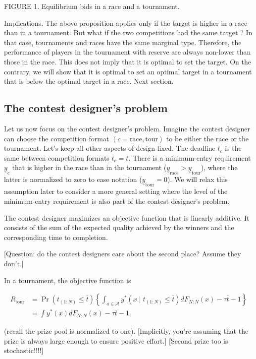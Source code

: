\documentclass[12pt,]{article}
\theoremstyle{plain} %
\newcommand\deadline{\bar{t}}
\newcommand\target{\underline{y}}
\newcommand\race{\text{race}}
\newcommand\tournament{\text{tour}}
\begin{document}
FIGURE 1. Equilibrium bids in a race and a tournament.

Implications. The above proposition applies only if the target is higher
in a race than in a tournament. But what if the two competitions had the
same target ? In that case, tournaments and races have the same marginal
type. Therefore, the performance of players in the tournament with
reserve are always non-lower than those in the race. This does not imply
that it is optimal to set the target. On the contrary, we will show that
it is optimal to set an optimal target in a tournament that is below the
optimal target in a race. Next section.

\subsection{The contest designer's
problem}\label{the-contest-designers-problem}

Let us now focus on the contest designer's problem. Imagine the contest
designer can choose the competition format \((c=\race, \tournament)\) to
be either the race or the tournament. Let's keep all other aspects of
design fixed. The deadline \(\deadline_c\) is the same between
competition formats \(\deadline_c=\deadline\). There is a minimum-entry
requirement \(\target_c\) that is higher in the race than in the
tournament (\(\target_\race > \target_\tournament\)), where the latter
is normalized to zero to ease notation (\(\target_\tournament=0\)). We
will relax this assumption later to consider a more general setting
where the level of the minimum-entry requirement is also part of the
contest designer's problem.

The contest designer maximizes an objective function that is linearly
additive. It consists of the sum of the expected quality achieved by the
winners and the corresponding time to completion.

{[}Question: do the contest designers care about the second place?
Assume they don't.{]}

In a tournament, the objective function is

\begin{align}
R_\tournament & = \Pr(t_{(1:N)}\leq \deadline) \left\{\int_{a\in\mathcal A} y^*(x \mid t_{(1:N)}\leq \deadline) dF_{N:N}(x) - \tau \deadline - 1 \right\} \nonumber\\
  & = \int y^*(x) dF_{N:N}(x) - \tau \deadline - 1. 
\end{align}

(recall the prize pool is normalized to one). {[}Implicitly, you're
assuming that the prize is always large enough to ensure positive
effort.{]} {[}Second prize too is stochastic!!!!{]}
\end{document}
